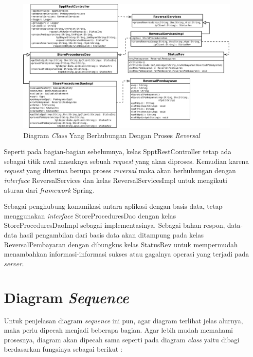 \begin{enumerate}
  \begin{figure}[H]
    \centering
    \includegraphics[width=1\textwidth]{./resources/uml/uml-class-rev}
    \caption{Diagram \textit{Class} Yang Berhubungan Dengan Proses \textit{Reversal}}
    \label{fig:uml-class-rev}
  \end{figure}
  
  Seperti pada bagian-bagian sebelumnya, kelas SpptRestController tetap ada sebagai titik awal masuknya sebuah \textit{request} yang akan diproses. Kemudian karena \textit{request} yang diterima berupa proses \textit{reversal} maka akan berhubungan dengan \textit{interface} ReversalServices dan kelas ReversalServicesImpl untuk mengikuti aturan dari \textit{framework} Spring.
  
  Sebagai penghubung komunikasi antara aplikasi dengan basis data, tetap menggunakan \textit{interface} StoreProceduresDao dengan kelas StoreProceduresDaoImpl sebagai implementasinya. Sebagai bahan respon, data-data hasil pengambilan dari basis data akan ditampung pada kelas ReversalPembayaran dengan dibungkus kelas StatusRev untuk mempermudah menambahkan informasi-informasi sukses atau gagalnya operasi yang terjadi pada \textit{server}.
  
\end{enumerate}

\section{Diagram \textit{Sequence}}

Untuk penjelasan diagram \textit{sequence} ini pun, agar diagram terlihat jelas alurnya, maka perlu dipecah menjadi beberapa bagian. Agar lebih mudah memahami prosesnya, diagram akan dipecah sama seperti pada diagram \textit{class} yaitu dibagi berdasarkan fungsinya sebagai berikut :

